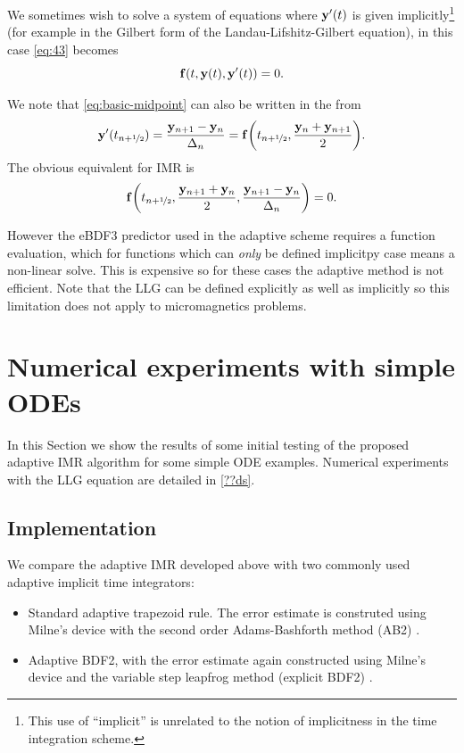 We sometimes wish to solve a system of equations where $\mathbf{y}'(t)$ is given implicitly\footnote{This use of ``implicit'' is unrelated to the notion of implicitness in the time integration scheme.} (for example in the Gilbert form of the Landau-Lifshitz-Gilbert equation), in this case \cref{eq:43} becomes
\begin{equation}
  {\mathbf{f}{\left( t, \mathbf{y}(t), \mathbf{y}'(t) \right)}} = 0.
\end{equation}

We note that \cref{eq:basic-midpoint} can also be written in the from
\begin{equation}
  \mathbf{y}'(t_{n+\nicefrac{1}{2}}) = \frac{\mathbf{y}_{n+1} - \mathbf{y}_n}{\Delta_{n}} =  {\mathbf{f}{\left( t_{n+\nicefrac{1}{2}}, \frac{\mathbf{y}_n + \mathbf{y}_{n+1}}{2} \right)}}.
\end{equation}
The obvious equivalent for IMR is
\begin{equation}
  {\mathbf{f}{\left( t_{n+\nicefrac{1}{2}}, \frac{\mathbf{y}_{n+1} + \mathbf{y}_n}{2}, \frac{\mathbf{y}_{n+1} - \mathbf{y}_n}{\Delta_{n}} \right)}} = 0.
\end{equation}

However the eBDF3 predictor used in the adaptive scheme requires a function evaluation, which for functions which can \emph{only} be defined implicitpy case means a non-linear solve.
This is expensive so for these cases the adaptive method is not efficient.
Note that the LLG can be defined explicitly as well as implicitly so this limitation does not apply to micromagnetics problems.


\section{Numerical experiments with simple ODEs}
\label{sec:aimr-testing}



In this Section we show the results of some initial testing of the proposed adaptive IMR algorithm for some simple ODE examples.
Numerical experiments with the LLG equation are detailed in \cref{??ds}.


\subsection{Implementation}
\label{sec:aimr-implementation}

We compare the adaptive IMR developed above with two commonly used adaptive implicit time integrators:
\begin{itemize}
\item Standard adaptive trapezoid rule. 
  The error estimate is construted using Milne's device with the second order Adams-Bashforth method (AB2) \cite[707]{GreshoSani}.
\item Adaptive BDF2, with the error estimate again constructed using Milne's device and the variable step leapfrog method (\ie explicit BDF2) \cite[715]{GreshoSani}.
\end{itemize}

